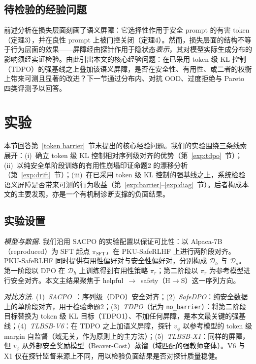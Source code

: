 \documentclass[lettersize,journal]{IEEEtran}
\begin{document}
\subsection{待检验的经验问题}
前述分析在损失层面刻画了语义屏障：它选择性作用于安全 prompt 的有害 token（定理3），并在良性 prompt 上被门控关闭（定理4）。然而，损失层面的结构不等于行为层面的效果——屏障经由探针作用于隐状态\textit{表示}，其对模型实际生成分布的影响须经实证检验。由此引出本文的核心经验问题：在已采用 token 级 KL 控制（TDPO）的强基线之上叠加该语义屏障，是否在安全性、有用性、或二者的权衡上带来可测且显著的改进？下一节通过分布内、对抗 OOD、过度拒绝与 Pareto 四类评测予以回答。

\section{实验}
本节回答第~\ref{token barrier}~节末提出的核心经验问题。我们的实验围绕三条线索展开：(i)~确立 token 级 KL 控制相对序列级对齐的优势（第~\ref{exp:tdpo}~节）；(ii)~以纯安全单阶段训练的有用性崩塌印证命题2 的漂移分析（第~\ref{exp:drift}~节）；(iii)~在已采用 token 级 KL 控制的强基线之上，系统检验语义屏障是否带来可测的行为收益（第~\ref{exp:barrier}--\ref{exp:diag}~节）。后者构成本文的主要发现，亦是一个有机制诊断支撑的负面结果。

\subsection{实验设置}\label{exp:setup}
\textit{模型与数据.} 我们沿用 SACPO 的实验配置以保证可比性：以 Alpaca-7B（reproduced）为 SFT 起点 $\pi_{\text{SFT}}$，在 PKU-SafeRLHF 上进行两阶段对齐。PKU-SafeRLHF 同时提供有用性偏好对与安全性偏好对，分别构成 $\mathcal{D}_h$ 与 $\mathcal{D}_s$。第一阶段以 DPO 在 $\mathcal{D}_h$ 上训练得到有用性策略 $\pi_r$；第二阶段以 $\pi_r$ 为参考模型进行安全对齐。本文主结果聚焦于 helpful~$\to$~safety（H$\to$S）这一序列方向。

\textit{对比方法.} (1)~\emph{SACPO}~\cite{wachi2024stepwise}：序列级（DPO）安全对齐；(2)~\emph{SafeDPO}：纯安全数据上的单阶段对齐，用于检验命题2；(3)~\emph{TDPO}（记为 \texttt{no\_barrier}）：将第二阶段目标替换为 token 级 KL 目标（TDPO1）、不加任何屏障，是本文最关键的强基线；(4)~\emph{TLBSB-V6}：在 TDPO 之上加语义屏障，探针 $v_\phi$ 以参考模型的 token 级 margin 自监督（域无关，作为原则上的主方法）；(5)~\emph{TLBSB-X1}：同样的屏障，但 $v_\phi$ 从外部安全奖励模型（Beaver-Cost）蒸馏（域匹配的强教师变体）。V6 与 X1 仅在探针监督来源上不同，用以检验负面结果是否对探针质量稳健。
\end{document}
